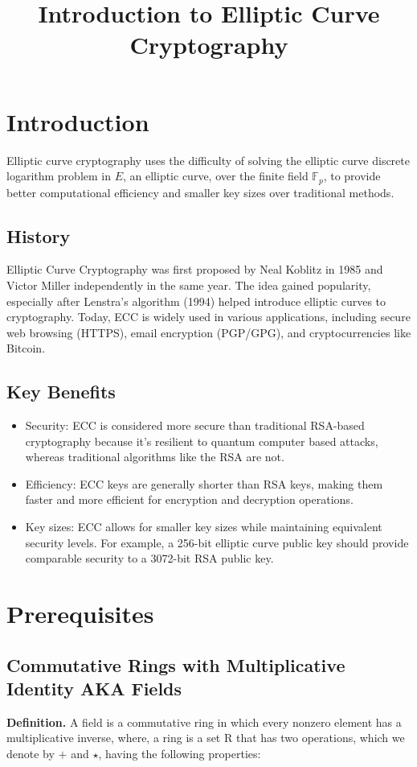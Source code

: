 \documentclass{article}
\title{Introduction to Elliptic Curve Cryptography}
\begin{document}
\maketitle

\section{Introduction}
Elliptic curve cryptography uses the difficulty of solving the elliptic curve discrete logarithm problem in $E$, an elliptic curve, over the finite field $\mathbb{F}_p$, to provide better computational efficiency and smaller key sizes over traditional methods.
\subsection{History}
Elliptic Curve Cryptography was first proposed by Neal Koblitz in 1985 and Victor Miller independently in the same year. The idea gained popularity, especially after Lenstra's algorithm (1994) helped introduce elliptic curves to cryptography. Today, ECC is widely used in various applications, including secure web browsing (HTTPS), email encryption (PGP/GPG), and cryptocurrencies like Bitcoin.
\subsection{Key Benefits}
\begin{itemize}
    \item Security: ECC is considered more secure than traditional RSA-based cryptography because it's resilient to quantum computer based attacks, whereas traditional algorithms like the RSA are not.
    \item Efficiency: ECC keys are generally shorter than RSA keys, making them faster and more efficient for encryption and decryption operations.
    \item Key sizes: ECC allows for smaller key sizes while maintaining equivalent security levels. For example, a 256-bit elliptic curve public key should provide comparable security to a 3072-bit RSA public key. 
\end{itemize}
\section{Prerequisites}
\subsection{Commutative Rings with Multiplicative Identity AKA Fields}
\textbf{Definition.} A field is a commutative  ring in which every nonzero element has a multiplicative inverse, where, a ring is a set R that has two operations, which we denote by $+$ and $\star$, having the following properties: \\
\end{document}
